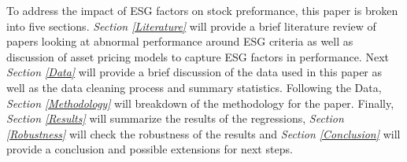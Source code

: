 To address the impact of ESG factors on stock preformance, this paper is broken into five sections. \textit{Section \ref{Literature}} will provide a  brief literature review of papers looking at abnormal performance around ESG criteria as well as discussion of asset pricing models to capture ESG factors in performance. Next \textit{ Section \ref{Data}}  will provide a brief discussion of the data used in this paper as well as the data cleaning process and summary statistics. Following the Data, \textit{Section \ref{Methodology}} will breakdown of the methodology for the paper. Finally, \textit{Section \ref{Results}}  will summarize the results of the regressions, \textit{Section \ref{Robustness}} will check the robustness of the results and \textit{Section \ref{Conclusion}} will provide a conclusion and possible extensions for next steps. 
